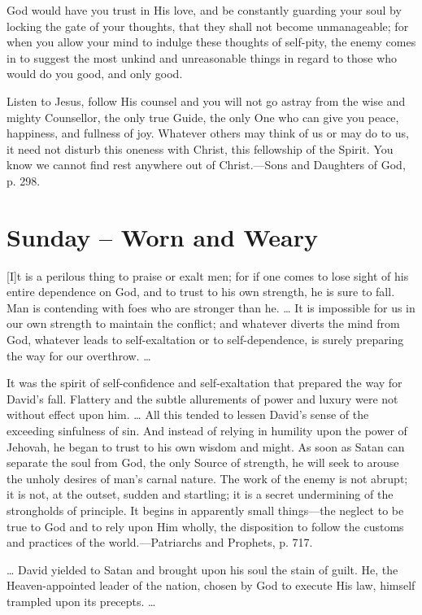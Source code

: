 \documentclass[a4paper, 10pt, twoside, headings=small]{scrartcl}
\begin{document}
\begin{multicols}{2}
God would have you trust in His love, and be constantly guarding your soul by locking the gate of your thoughts, that they shall not become unmanageable; for when you allow your mind to indulge these thoughts of self-pity, the enemy comes in to suggest the most unkind and unreasonable things in regard to those who would do you good, and only good.

Listen to Jesus, follow His counsel and you will not go astray from the wise and mighty Counsellor, the only true Guide, the only One who can give you peace, happiness, and fullness of joy. Whatever others may think of us or may do to us, it need not disturb this oneness with Christ, this fellowship of the Spirit. You know we cannot find rest anywhere out of Christ.—Sons and Daughters of God, p. 298.

\section*{Sunday – Worn and Weary}

[I]t is a perilous thing to praise or exalt men; for if one comes to lose sight of his entire dependence on God, and to trust to his own strength, he is sure to fall. Man is contending with foes who are stronger than he. … It is impossible for us in our own strength to maintain the conflict; and whatever diverts the mind from God, whatever leads to self-exaltation or to self-dependence, is surely preparing the way for our overthrow. …

It was the spirit of self-confidence and self-exaltation that prepared the way for David’s fall. Flattery and the subtle allurements of power and luxury were not without effect upon him. … All this tended to lessen David’s sense of the exceeding sinfulness of sin. And instead of relying in humility upon the power of Jehovah, he began to trust to his own wisdom and might. As soon as Satan can separate the soul from God, the only Source of strength, he will seek to arouse the unholy desires of man’s carnal nature. The work of the enemy is not abrupt; it is not, at the outset, sudden and startling; it is a secret undermining of the strongholds of principle. It begins in apparently small things—the neglect to be true to God and to rely upon Him wholly, the disposition to follow the customs and practices of the world.—Patriarchs and Prophets, p. 717.

… David yielded to Satan and brought upon his soul the stain of guilt. He, the Heaven-appointed leader of the nation, chosen by God to execute His law, himself trampled upon its precepts. …


\end{multicols}
\end{document}
